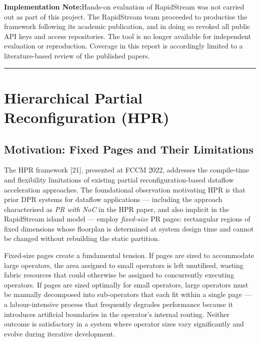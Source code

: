 \begin{mdframed}[style=impnote]
\textbf{Implementation Note:}\quad Hands-on evaluation of RapidStream was not carried out as part of this project. The RapidStream team proceeded to productise the framework following its academic publication, and in doing so revoked all public API keys and access repositories. The tool is no longer available for independent evaluation or reproduction. Coverage in this report is accordingly limited to a literature-based review of the published papers.
\end{mdframed}

\vspace{0.4em}\hrule\vspace{0.4em}

\section{Hierarchical Partial Reconfiguration (HPR)}

\subsection{Motivation: Fixed Pages and Their Limitations}

The HPR framework [21], presented at FCCM 2022, addresses the compile-time and flexibility limitations of existing partial reconfiguration-based dataflow acceleration approaches. The foundational observation motivating HPR is that prior DPR systems for dataflow applications — including the approach characterised as \textit{PR with NoC} in the HPR paper, and also implicit in the RapidStream island model — employ \textit{fixed-size} PR pages: rectangular regions of fixed dimensions whose floorplan is determined at system design time and cannot be changed without rebuilding the static partition.

Fixed-size pages create a fundamental tension. If pages are sized to accommodate large operators, the area assigned to small operators is left unutilised, wasting fabric resources that could otherwise be assigned to concurrently executing operators. If pages are sized optimally for small operators, large operators must be manually decomposed into sub-operators that each fit within a single page — a labour-intensive process that frequently degrades performance because it introduces artificial boundaries in the operator's internal routing. Neither outcome is satisfactory in a system where operator sizes vary significantly and evolve during iterative development.

